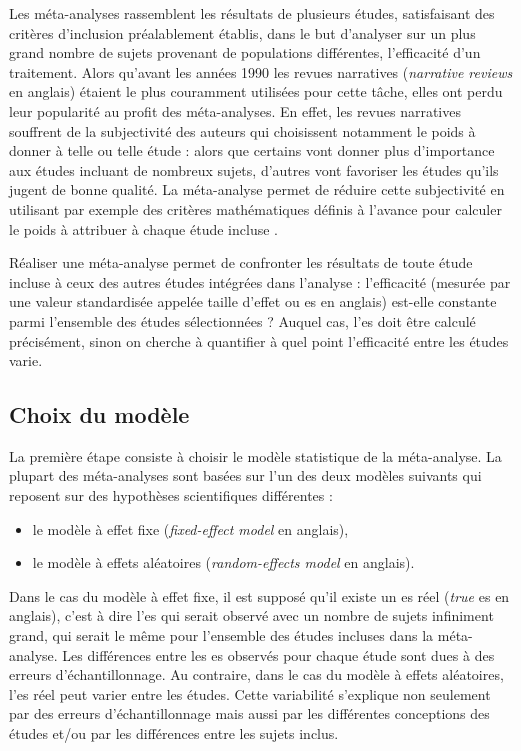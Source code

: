 Les méta-analyses rassemblent les résultats de plusieurs études, satisfaisant des critères d'inclusion préalablement établis, dans le but d'analyser
sur un plus grand nombre de sujets provenant de populations différentes, l'efficacité d'un traitement. Alors qu'avant les années 1990 les revues narratives
(\textit{narrative reviews} en anglais) étaient le plus couramment utilisées pour cette tâche, elles ont perdu leur popularité au profit des méta-analyses.
En effet, les revues narratives souffrent de la subjectivité des auteurs qui choisissent notamment le poids à donner à telle ou telle étude : alors que certains
vont donner plus d'importance aux études incluant de nombreux sujets, d'autres vont favoriser les études qu'ils jugent de bonne qualité. La méta-analyse permet 
de réduire cette subjectivité en utilisant par exemple des critères mathématiques définis à l'avance pour calculer le poids à attribuer à chaque étude incluse
\citep{Borenstein2009}.

Réaliser une méta-analyse permet de confronter les résultats de toute étude incluse à ceux des autres études intégrées dans l'analyse : l'efficacité (mesurée par 
une valeur standardisée appelée taille d'effet ou \gls{es} en anglais) est-elle constante parmi l'ensemble des études sélectionnées ? 
Auquel cas, l'\gls{es} doit être calculé précisément, sinon on cherche à quantifier à quel point l'efficacité entre les études varie.

\subsection{Choix du modèle}

La première étape consiste à choisir le modèle statistique de la méta-analyse. La plupart des méta-analyses sont basées sur l'un des deux modèles 
suivants qui reposent sur des hypothèses scientifiques différentes \citep{Borenstein2009} :
\renewcommand{\labelitemi}{$\bullet$}
\begin{itemize}
\item le modèle à effet fixe (\textit{fixed-effect model} en anglais),
\item le modèle à effets aléatoires (\textit{random-effects model} en anglais).
\end{itemize}

Dans le cas du modèle à effet fixe, il est supposé qu'il existe un \gls{es} réel (\textit{true} \gls{es} en anglais), c'est à dire l'\gls{es} qui serait
observé avec un nombre de sujets infiniment grand, qui serait le même pour l'ensemble des études incluses dans la méta-analyse. Les différences entre
les \gls{es} observés pour chaque étude sont dues à des erreurs d'échantillonnage. Au contraire, dans le cas du modèle à effets aléatoires, 
l'\gls{es} réel peut varier entre les études. Cette variabilité s'explique non seulement par des erreurs d'échantillonnage mais aussi par 
les différentes conceptions des études et/ou par les différences entre les sujets inclus.

